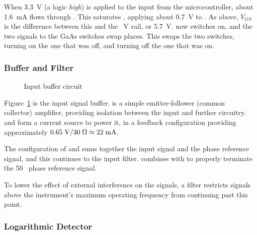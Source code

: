 When 3.3~V (a logic \emph{high}) is applied to the input from the
microcontroller, about 1.6~mA flows through . This
saturates , applying about 0.7~V to . As above,
$V_{GS}$ is the difference between this and the ~V rail, or
5.7~V.  now switches on, and the two signals to the GaAs
switches swap places. This swaps the two switches, turning on the one that was
off, and turning off the one that was on.


\subsubsection{Buffer and Filter}

\begin{figure}[H]
\centering
{}
\caption{Input buffer circuit}
\label{fig:buffer}
\end{figure}

Figure~\ref{fig:buffer} is the input signal buffer.  is a simple
emitter-follower (common collector) amplifier, providing isolation
between the input and further circuitry.  and  form
a current source to power it, in a feedback configuration providing
approximately $0.65\;\mathrm{V} / 30\;\Omega \approx 22\;\mathrm{mA}$.

The configuration of  and  sums together
the input signal and the phase reference signal, and this continues to the
input filter.  combines with  to properly
terminate the 50~\Ohm{} phase reference signal.

To lower the effect of external interference on the signals, a filter restricts
signals above the instrument's maximum operating frequency from continuing
past this point.

\subsubsection{Logarithmic Detector}
